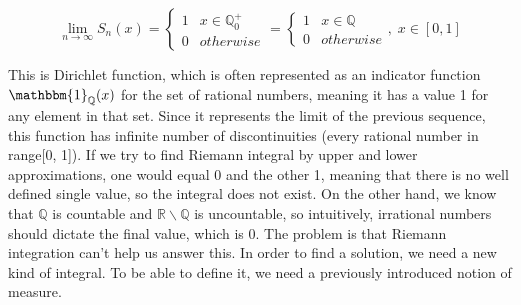 \documentclass{article}
\begin{document}
\[ \lim_{n\to\infty}S_n(x) = \begin{cases}
    1 & x \in \mathbb{Q}_{0}^{+} \\
    0 & otherwise
\end{cases} = \begin{cases}
    1 & x \in \mathbb{Q} \\
    0 & otherwise
\end{cases},\; x \in [0, 1] \]

This is Dirichlet function, which is often represented as an indicator function $\mathbbm{1}_{\mathbb{Q}}(x)$ for the set of rational numbers, meaning it has a value 1 for any element in that set. Since it represents the limit of the previous sequence, this function has infinite number of discontinuities (every rational number in range[0, 1]). If we try to find Riemann integral by upper and lower approximations, one would equal 0 and the other 1, meaning that there is no well defined single value, so the integral does not exist. On the other hand, we know that $\mathbb{Q}$ is countable and $\mathbb{R}\backslash\mathbb{Q}$ is uncountable, so intuitively, irrational numbers should dictate the final value, which is 0. The problem is that Riemann integration can't help us answer this. In order to find a solution, we need a new kind of integral. To be able to define it, we need a previously introduced notion of measure.
\end{document}
